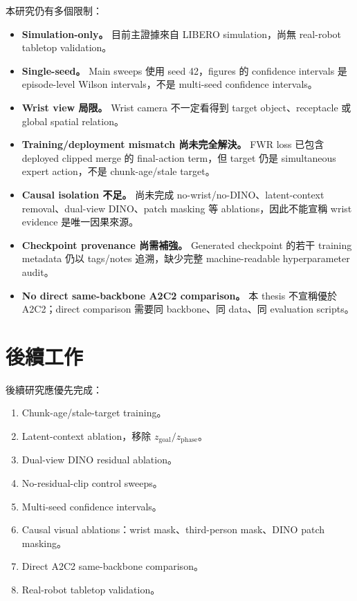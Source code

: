 \documentclass[12pt,a4paper,oneside]{report}
\begin{document}
本研究仍有多個限制：
\begin{itemize}
  \item \textbf{Simulation-only。} 目前主證據來自 LIBERO simulation，尚無 real-robot tabletop validation。
  \item \textbf{Single-seed。} Main sweeps 使用 seed 42，figures 的 confidence intervals 是 episode-level Wilson intervals，不是 multi-seed confidence intervals。
  \item \textbf{Wrist view 局限。} Wrist camera 不一定看得到 target object、receptacle 或 global spatial relation。
  \item \textbf{Training/deployment mismatch 尚未完全解決。} FWR loss 已包含 deployed clipped merge 的 final-action term，但 target 仍是 simultaneous expert action，不是 chunk-age/stale target。
  \item \textbf{Causal isolation 不足。} 尚未完成 no-wrist/no-DINO、latent-context removal、dual-view DINO、patch masking 等 ablations，因此不能宣稱 wrist evidence 是唯一因果來源。
  \item \textbf{Checkpoint provenance 尚需補強。} Generated checkpoint 的若干 training metadata 仍以 tags/notes 追溯，缺少完整 machine-readable hyperparameter audit。
  \item \textbf{No direct same-backbone A2C2 comparison。} 本 thesis 不宣稱優於 A2C2；direct comparison 需要同 backbone、同 data、同 evaluation scripts。
\end{itemize}

\section{後續工作}

後續研究應優先完成：
\begin{enumerate}[leftmargin=2em]
  \item Chunk-age/stale-target training。
  \item Latent-context ablation，移除 $z_{\mathrm{goal}}/z_{\mathrm{phase}}$。
  \item Dual-view DINO residual ablation。
  \item No-residual-clip control sweeps。
  \item Multi-seed confidence intervals。
  \item Causal visual ablations：wrist mask、third-person mask、DINO patch masking。
  \item Direct A2C2 same-backbone comparison。
  \item Real-robot tabletop validation。
\end{enumerate}
\end{document}
